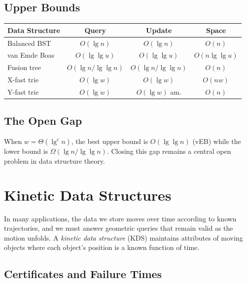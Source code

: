 \subsection{Upper Bounds}

\begin{center}
\begin{tabular}{lccc}
\toprule
Data Structure & Query & Update & Space \\
\midrule
Balanced BST & $O(\lg n)$ & $O(\lg n)$ & $O(n)$ \\
van Emde Boas & $O(\lg \lg u)$ & $O(\lg \lg u)$ & $O(n \lg \lg u)$ \\
Fusion tree & $O(\lg n / \lg \lg n)$ & $O(\lg n / \lg \lg n)$ & $O(n)$ \\
X-fast trie & $O(\lg w)$ & $O(\lg w)$ & $O(nw)$ \\
Y-fast trie & $O(\lg w)$ & $O(\lg w)$ am. & $O(n)$ \\
\bottomrule
\end{tabular}
\end{center}

\subsection{The Open Gap}

When $w = \Theta(\lg^c n)$, the best upper bound is $O(\lg \lg n)$ (vEB) while the lower bound is $\Omega(\lg n / \lg \lg n)$. Closing this gap remains a central open problem in data structure theory.


\section{Kinetic Data Structures}
\label{sec:kinetic-ds}

In many applications, the data we store moves over time according to known trajectories, and we must answer geometric queries that remain valid as the motion unfolds. A \emph{kinetic data structure} (KDS) maintains attributes of moving objects where each object's position is a known function of time.

\subsection{Certificates and Failure Times}

